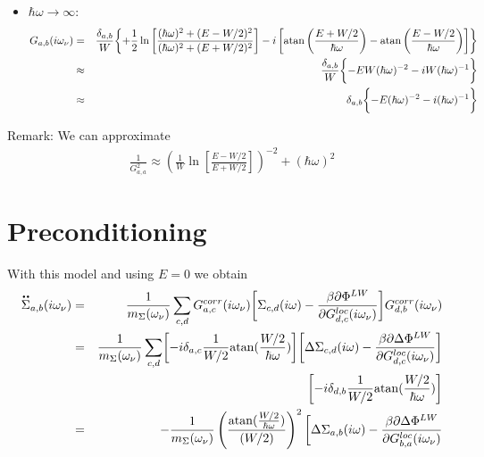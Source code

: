 \documentclass[11pt,a4paper]{report}
\begin{document}
\begin{itemize}
%
\item $\hbar\omega\rightarrow \infty$:
\begin{eqnarray}
G_{a,b}(i\omega_\nu)&=&
\frac{\delta_{a,b}}{W}
\biggl\lbrace
+\frac{1}{2}\ln\left[
\frac{(\hbar\omega)^2+(E-W/2)^2}{(\hbar\omega)^2+(E+W/2)^2}
\right]
-i \left[\atan\left(\frac{E+W/2}{\hbar\omega}\right)
-\atan\left(\frac{E-W/2}{\hbar\omega}\right)\right]
\biggr\rbrace
\nonumber\\
%
&\approx&
\frac{\delta_{a,b}}{W}
\biggl\lbrace
-EW(\hbar\omega)^{-2}
-i W (\hbar\omega)^{-1}
\biggr\rbrace
%
\nonumber\\
&\approx&
\delta_{a,b}
\biggl\lbrace
-E(\hbar\omega)^{-2}
-i  (\hbar\omega)^{-1}
\biggr\rbrace
\end{eqnarray}
\end{itemize}


Remark: We can approximate
\begin{eqnarray}
\frac{1}{G_{a,a}^2}\approx \left(
\frac{1}{W}\ln\left[\frac{E-W/2}{E+W/2}\right] \right)^{-2}
  +(\hbar\omega)^2
\end{eqnarray}

\section{Preconditioning}
With this model and using $E=0$ we obtain
\begin{eqnarray*}
\ddot{\Sigma}_{a,b}(i\omega_\nu)
&=&
\frac{1}{m_\Sigma(\omega_\nu)}
\sum_{c,d}
G^{corr}_{a,c}(i\omega_\nu)
\biggl[\Sigma_{c,d}(i\omega)
-\frac{\beta\partial \Phi^{LW}}{\partial{G}^{loc}_{d,c}(i\omega_\nu)}
\biggr]
G^{corr}_{d,b}(i\omega_\nu)
\nonumber\\
&=&
\frac{1}{m_\Sigma(\omega_\nu)}
\sum_{c,d}
\biggl[-i\delta_{a,c} \frac{1}{W/2}\atan(\frac{W/2}{\hbar\omega})\biggr]
\biggl[\Delta\Sigma_{c,d}(i\omega)
-\frac{\beta\partial \Delta\Phi^{LW}}{\partial{G}^{loc}_{d,c}(i\omega_\nu)}
\biggr]
\nonumber\\
&&
\biggl[-i\delta_{d,b} \frac{1}{W/2}\atan(\frac{W/2}{\hbar\omega})\biggr]
\nonumber\\
&=&
-\frac{1}{m_\Sigma(\omega_\nu)}
\left(\frac{\atan(\frac{W/2}{\hbar\omega})}{(W/2)}\right)^2
\biggl[\Delta\Sigma_{a,b}(i\omega)
-\frac{\beta\partial \Delta\Phi^{LW}}{\partial{G}^{loc}_{b,a}(i\omega_\nu)}
\end{eqnarray*}
\end{document}
